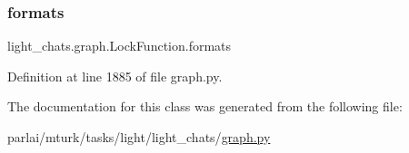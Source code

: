 \subsubsection{\texorpdfstring{formats}{formats}}
{\footnotesize\ttfamily light\+\_\+chats.\+graph.\+Lock\+Function.\+formats}



Definition at line 1885 of file graph.\+py.



The documentation for this class was generated from the following file\+:\begin{DoxyCompactItemize}
\item 
parlai/mturk/tasks/light/light\+\_\+chats/\hyperlink{parlai_2mturk_2tasks_2light_2light__chats_2graph_8py}{graph.\+py}\end{DoxyCompactItemize}
